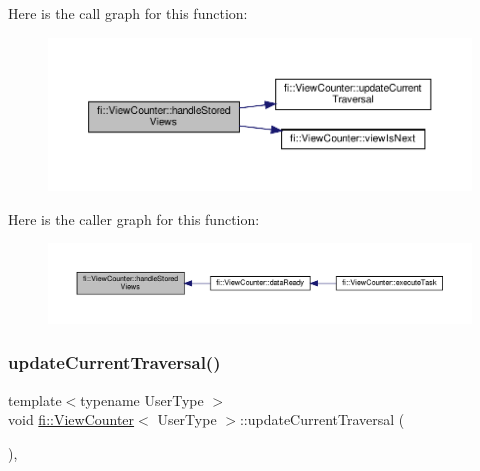 Here is the call graph for this function\+:
\nopagebreak
\begin{figure}[H]
\begin{center}
\leavevmode
\includegraphics[width=350pt]{df/dae/classfi_1_1ViewCounter_a6941e894f768fe1f0deb1b7ff771e2bc_cgraph}
\end{center}
\end{figure}
Here is the caller graph for this function\+:
\nopagebreak
\begin{figure}[H]
\begin{center}
\leavevmode
\includegraphics[width=350pt]{df/dae/classfi_1_1ViewCounter_a6941e894f768fe1f0deb1b7ff771e2bc_icgraph}
\end{center}
\end{figure}
\mbox{\label{classfi_1_1ViewCounter_a8a1bd60b42035140d6abee7e58fc3561}} 
\subsubsection{\texorpdfstring{update\+Current\+Traversal()}{updateCurrentTraversal()}}
{\footnotesize\ttfamily template$<$typename User\+Type $>$ \\
void \hyperlink{classfi_1_1ViewCounter}{fi\+::\+View\+Counter}$<$ User\+Type $>$\+::update\+Current\+Traversal (\begin{DoxyParamCaption}{ }\end{DoxyParamCaption})\hspace{0.3cm}{\ttfamily [inline]}, {\ttfamily [private]}}



